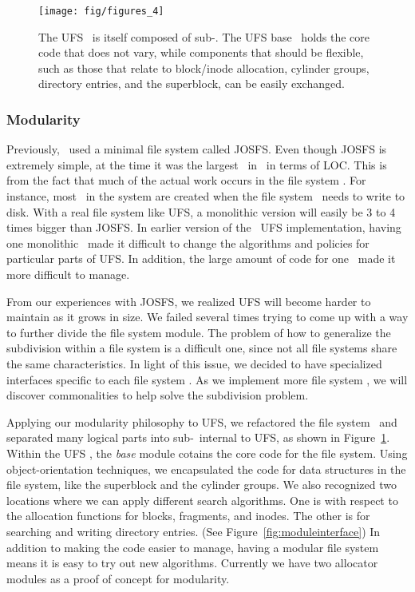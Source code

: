 \begin{figure}[htb]
  \centering
  \texttt{[image: fig/figures\_4]}
  \caption{\label{fig:ufsmodules} The UFS \module\ is itself composed of
  sub-\modules. The UFS base \module\ holds the core code that does not
  vary, while components that should be flexible, such as those that relate
  to block/inode allocation, cylinder groups, directory entries, and the
  superblock, can be easily exchanged.}
\end{figure}

\subsubsection {Modularity}
Previously, \Kudos\ used a minimal file system called JOSFS. Even though JOSFS
is extremely simple, at the time it was the largest \module\ in \Kudos\ in
terms of LOC. This is from the fact that much of the actual work occurs in the
file system \modules. For instance, most \chdescs\ in the system are created
when the file system \modules\ needs to write to disk. With a real file system
like UFS, a monolithic version will easily be 3 to 4 times bigger than JOSFS.
In earlier version of the \Kudos\ UFS implementation, having one monolithic
\module\ made it difficult to change the algorithms and policies for
particular parts of UFS. In addition, the large amount of code for one
\module\ made it more difficult to manage.

From our experiences with JOSFS, we realized UFS will become harder to maintain
as it grows in size. We failed several times trying to come up with a way to
further divide the file system module. The problem of how to generalize the
subdivision within a file system is a difficult one, since not all file systems
share the same characteristics. In light of this issue, we decided to have
specialized interfaces specific to each file system \module. As we implement
more file system \modules, we will discover commonalities to help solve the
subdivision problem.

Applying our modularity philosophy to UFS, we refactored the file system
\module\ and separated many logical parts into sub-\modules\ internal to UFS,
as shown in Figure~\ref{fig:ufsmodules}.
Within the UFS \module, the \emph{base} module cotains the core code for the
file system. Using object-orientation techniques, we encapsulated the code
for data structures in the file system, like the superblock and the cylinder
groups. We also recognized two locations where we can apply different
search algorithms. One is with respect to the allocation functions for blocks,
fragments, and inodes. The other is for searching and writing directory
entries. (See Figure~\ref{fig:moduleinterface}) In addition to making the code
easier to manage, having a modular file system means it is easy to try out new
algorithms. Currently we have two allocator modules as a proof of concept for
modularity.

